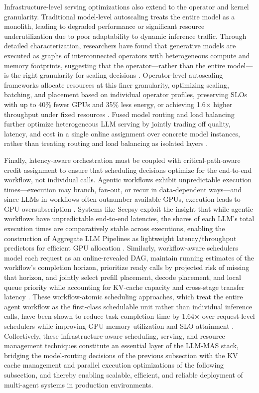 \documentclass[11pt]{article}
\begin{document}
Infrastructure-level serving optimizations also extend to the operator and kernel granularity. Traditional model-level autoscaling treats the entire model as a monolith, leading to degraded performance or significant resource underutilization due to poor adaptability to dynamic inference traffic. Through detailed characterization, researchers have found that generative models are executed as graphs of interconnected operators with heterogeneous compute and memory footprints, suggesting that the operator---rather than the entire model---is the right granularity for scaling decisions \cite{ref298}. Operator-level autoscaling frameworks allocate resources at this finer granularity, optimizing scaling, batching, and placement based on individual operator profiles, preserving SLOs with up to 40\% fewer GPUs and 35\% less energy, or achieving 1.6× higher throughput under fixed resources \cite{ref298}. Fused model routing and load balancing further optimize heterogeneous LLM serving by jointly trading off quality, latency, and cost in a single online assignment over concrete model instances, rather than treating routing and load balancing as isolated layers \cite{ref299}.

Finally, latency-aware orchestration must be coupled with critical-path-aware credit assignment to ensure that scheduling decisions optimize for the end-to-end workflow, not individual calls. Agentic workflows exhibit unpredictable execution times---execution may branch, fan-out, or recur in data-dependent ways---and since LLMs in workflows often outnumber available GPUs, execution leads to GPU oversubscription \cite{ref300}. Systems like Scepsy exploit the insight that while agentic workflows have unpredictable end-to-end latencies, the shares of each LLM's total execution times are comparatively stable across executions, enabling the construction of Aggregate LLM Pipelines as lightweight latency/throughput predictors for efficient GPU allocation \cite{ref300}. Similarly, workflow-aware schedulers model each request as an online-revealed DAG, maintain running estimates of the workflow's completion horizon, prioritize ready calls by projected risk of missing that horizon, and jointly select prefill placement, decode placement, and local queue priority while accounting for KV-cache capacity and cross-stage transfer latency \cite{ref301}. These workflow-atomic scheduling approaches, which treat the entire agent workflow as the first-class schedulable unit rather than individual inference calls, have been shown to reduce task completion time by 1.64× over request-level schedulers while improving GPU memory utilization and SLO attainment \cite{ref302}. Collectively, these infrastructure-aware scheduling, serving, and resource management techniques constitute an essential layer of the LLM-MAS stack, bridging the model-routing decisions of the previous subsection with the KV cache management and parallel execution optimizations of the following subsection, and thereby enabling scalable, efficient, and reliable deployment of multi-agent systems in production environments.
\end{document}
